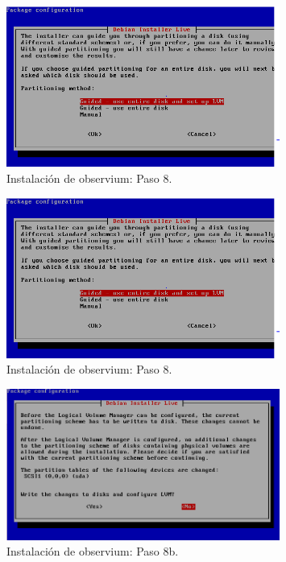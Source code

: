 \begin{figure}[htbp!]
	\centering
		\includegraphics[width=0.8\textwidth]{images/desarrollo/instalarObservium_paso8.png}
	\caption{Instalación de observium: Paso 8.}
\end{figure}

\begin{figure}[htbp!]
	\centering
		\includegraphics[width=0.8\textwidth]{images/desarrollo/instalarObservium_paso8.png}
	\caption{Instalación de observium: Paso 8.}
\end{figure}

\begin{figure}[htbp!]
	\centering
		\includegraphics[width=0.8\textwidth]{images/desarrollo/instalarObservium_paso8b.png}
	\caption{Instalación de observium: Paso 8b.}
\end{figure}

